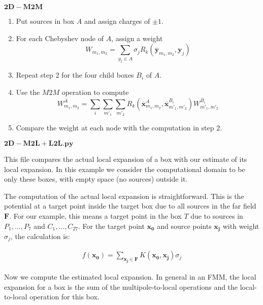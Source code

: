 \documentclass[11pt, oneside]{article}   	%
\begin{document}
\begin{appendices}
$\mathbf{2D-M2M}$
\begin{enumerate}
\item Put sources in box $A$ and assign charges of $\pm 1$.
\item For each Chebyshev node of $A$, assign a weight\\
$$W_{m_1,m_2}=\sum_{y_j\in A}\sigma_jR_k(\mathbf{\overline{y}}_{m_1,m_2},\mathbf{y}_j)$$
\item Repeat step $2$ for the four child boxes $B_i$ of $A$.
\item Use the $M2M$ operation to compute\\
$$W^A_{m_1,m_2}= \sum_{i}\sum_{m'_1}\sum_{m'_2} R_k(\mathbf{\overline{x}}^{A}_{m_1,m_2},\mathbf{\overline{x}}^{B_i}_{m'_1,m'_2})W^{B_i}_{m'_1,m'_2}$$
\item Compare the weight at each node with the computation in step $2$.
\end{enumerate}


$\mathbf{2D-M2L+L2L.py}$

This file compares the actual local expansion of a box with our estimate of its local expansion. In this example we consider the computational domain to be only these boxes, with empty space (no sources) outside it.

The computation of the actual local expansion is straightforward. This is the potential at a target point inside the target box due to all sources in the far field $\mathbf{F}$. For our example, this means a target point in the box $T$ due to sources in $P_1,\dots,P_7$ and $C_1,\dots,C_{27}$. For the target point $\mathbf{x_0}$ and source points $\mathbf{x_j}$ with weight $\sigma_j$, the calculation is:

\begin{align}
f(\mathbf{x_0}) = \sum_{\mathbf{x_j}\in \mathbf{F}} K(\mathbf{x_0},\mathbf{x_j})\sigma_j
\end{align}

Now we compute the estimated local expansion. In general in an FMM, the local expansion for a box is the sum of the multipole-to-local operations and the local-to-local operation for this box.


\end{appendices}
\end{document}
